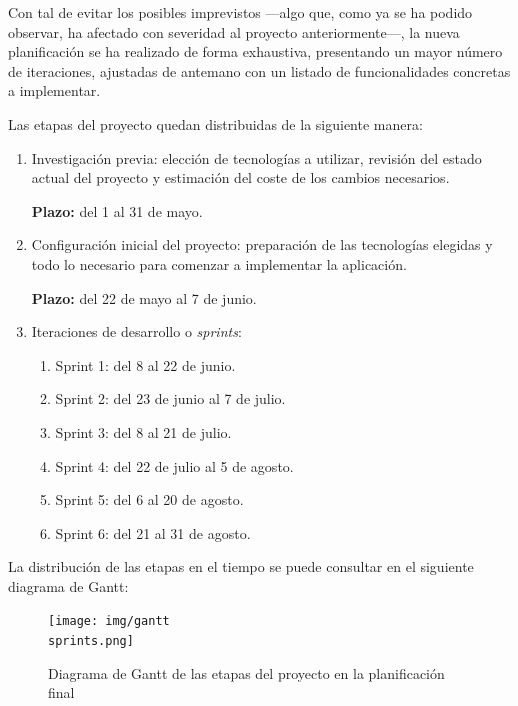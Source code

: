 \documentclass[10pt, a4paper]{aqademic}
\begin{document}
Con tal de evitar los posibles imprevistos ---algo que, como ya se ha podido observar, ha afectado con severidad al proyecto anteriormente---, la nueva planificación se ha realizado de forma exhaustiva, presentando un mayor número de iteraciones, ajustadas de antemano con un listado de funcionalidades concretas a implementar.

Las etapas del proyecto quedan distribuidas de la siguiente manera:

\begin{enumerate}
	\item Investigación previa: elección de tecnologías a utilizar, revisión del estado actual del proyecto y estimación del coste de los cambios necesarios.
	
	\textbf{Plazo:} del 1 al 31 de mayo. 
	
	\item Configuración inicial del proyecto: preparación de las tecnologías elegidas y todo lo necesario para comenzar a implementar la aplicación.
	
	\textbf{Plazo:} del 22 de mayo al 7 de junio.
	
	\item Iteraciones de desarrollo o \textit{sprints}: 
	\begin{enumerate}
		\item Sprint 1: del 8 al 22 de junio.
		
		\item Sprint 2: del 23 de junio al  7 de julio.
		
		\item Sprint 3: del 8 al 21 de julio.
		
		\item Sprint 4: del 22 de julio al 5 de agosto.
		
		\item Sprint 5: del 6 al 20 de agosto.
		
		\item Sprint 6: del 21 al 31 de agosto.
	\end{enumerate}
\end{enumerate}

La distribución de las etapas en el tiempo se puede consultar en el siguiente diagrama de Gantt:

\medskip

\begin{figure}[h]
	\centering
	\texttt{[image: img/gantt\\ sprints.png]}
	\caption{Diagrama de Gantt de las etapas del proyecto en la planificación final}
\end{figure}
\end{document}
